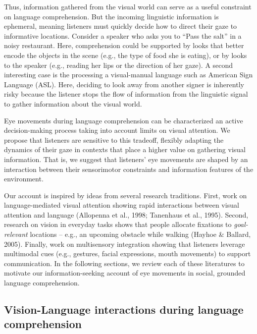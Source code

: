 \documentclass[english,floatsintext,man]{apa6}
\begin{document}
Thus, information gathered from the visual world can serve as a useful
constraint on language comprehension. But the incoming linguistic
information is ephemeral, meaning listeners must quickly decide how to
direct their gaze to informative locations. Consider a speaker who asks
you to \enquote{Pass the salt} in a noisy restaurant. Here,
comprehension could be supported by looks that better encode the objects
in the scene (e.g., the type of food she is eating), or by looks to the
speaker (e.g., reading her lips or the direction of her gaze). A second
interesting case is the processing a visual-manual language such as
American Sign Language (ASL). Here, deciding to look away from another
signer is inherently risky because the listener stops the flow of
information from the linguistic signal to gather information about the
visual world.

Eye movements during language comprehension can be characterized an
active decision-making process taking into account limits on visual
attention. We propose that listeners are sensitive to this tradeoff,
flexibly adapting the dynamics of their gaze in contexts that place a
higher value on gathering visual information. That is, we suggest that
listeners' eye movements are shaped by an interaction between their
sensorimotor constraints and information features of the environment.

Our account is inspired by ideas from several research traditions.
First, work on language-mediated visual attention showing rapid
interactions between visual attention and language (Allopenna et al.,
1998; Tanenhaus et al., 1995). Second, research on vision in everyday
tasks shows that people allocate fixations to \emph{goal-relevant}
locations -- e.g., an upcoming obstacle while walking (Hayhoe \&
Ballard, 2005). Finally, work on multisensory integration showing that
listeners leverage multimodal cues (e.g., gestures, facial expressions,
mouth movements) to support communication. In the following sections, we
review each of these literatures to motivate our information-seeking
account of eye movements in social, grounded language comprehension.

\hypertarget{vision-language-interactions-during-language-comprehension}{%
\subsection{Vision-Language interactions during language
comprehension}\label{vision-language-interactions-during-language-comprehension}}
\end{document}
